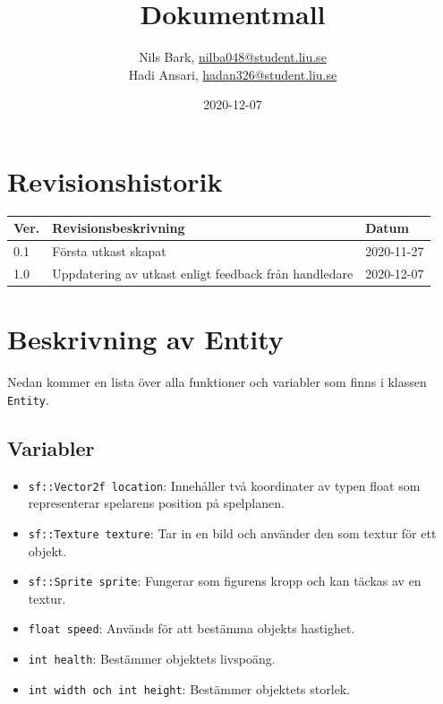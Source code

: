\documentclass{TDP003mall}
\author{Nils Bark, \url{nilba048@student.liu.se}\\
  Hadi Ansari, \url{hadan326@student.liu.se}}
\title{Dokumentmall}
\date{2020-12-07}
\begin{document}
\projectpage
\section{Revisionshistorik}
\begin{table}[!h]
\begin{tabularx}{\linewidth}{|l|X|l|}
\hline
Ver. & Revisionsbeskrivning & Datum \\\hline
0.1 & Första utkast skapat & 2020-11-27\\\hline
1.0 & Uppdatering av utkast enligt feedback från handledare & 2020-12-07\\\hline
\end{tabularx}
\end{table}

\section{Beskrivning av Entity}
Nedan kommer en lista över alla funktioner och variabler som finns i klassen \texttt{Entity}.
\subsection{Variabler}
\begin{itemize}
\item \texttt{sf::Vector2f location}: Innehåller två koordinater av typen float som representerar spelarens position på spelplanen.
\item \texttt{sf::Texture texture}: Tar in en bild och använder den som textur för ett objekt.
\item \texttt{sf::Sprite sprite}: Fungerar som figurens kropp och kan täckas av en textur.
\item \texttt{float speed}: Används för att bestämma objekts hastighet. 
\item \texttt{int health}: Bestämmer objektets livspoäng.
\item \texttt{int width och int height}: Bestämmer objektets storlek.

\end{itemize}
\end{document}
